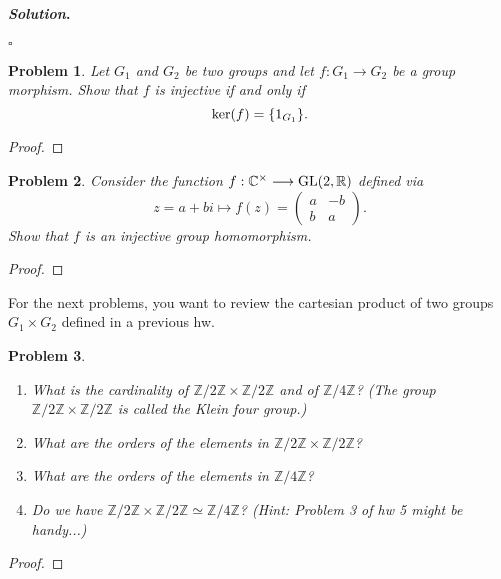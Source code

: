 \documentclass[reqno]{amsart}
\theoremstyle{plain}
\newtheorem{problem}{Problem}
\theoremstyle{definition}
\newenvironment{solution}{\paragraph{\emph{Solution}.}}{\hfill$\square$}
\begin{document}
\begin{solution}

\end{solution}

\begin{problem}
Let $G_{1}$ and $G_{2}$ be two groups and let $f:G_{1} \longrightarrow G_{2}$ be a group morphism.  Show that $f$ is injective if and only if
$${\rm ker}(f) = \{1_{G_{1}}\}. $$
\end{problem}
\begin{proof}

\end{proof}

\begin{problem}
Consider the function $f:\mathbb{C}^{\times} \longrightarrow {\rm GL}(2,\mathbb{R})$ defined via
\begin{equation*}
z = a + bi \mapsto f(z) = 
\begin{pmatrix}
a & -b \\
b & a
\end{pmatrix}.
\end{equation*}
Show that $f$ is an injective group homomorphism.
\end{problem}
\begin{proof}

\end{proof}


For the next problems, you want to review the cartesian product of two groups $G_{1} \times G_{2}$ defined in a previous hw.
\begin{problem}
\hspace{1cm}
\begin{enumerate}
\item What is the cardinality of $\mathbb{Z}/2\mathbb{Z}\times\mathbb{Z}/2\mathbb{Z}$ and of $\mathbb{Z}/4\mathbb{Z}$?  (The group $\mathbb{Z}/2\mathbb{Z} \times \mathbb{Z}/2\mathbb{Z}$ is called the Klein four group.)
\item What are the orders of the elements in $\mathbb{Z}/2\mathbb{Z}\times \mathbb{Z}/2\mathbb{Z}$?  
\item What are the orders of the elements in $\mathbb{Z}/4\mathbb{Z}$?
\item Do we have $\mathbb{Z}/2\mathbb{Z} \times \mathbb{Z}/2\mathbb{Z}\simeq \mathbb{Z}/4\mathbb{Z}$?  (Hint:  Problem 3 of hw 5 might be handy...)
\end{enumerate}
\end{problem}
\begin{proof}

\end{proof}
\end{document}
